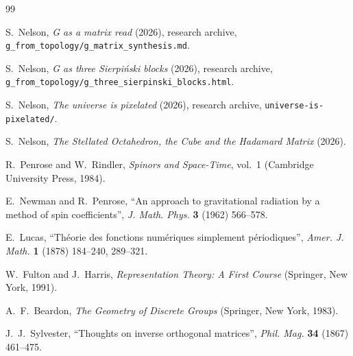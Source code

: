 \documentclass[twocolumn]{iopjournal}
\begin{document}
\begin{thebibliography}{99}

S.~Nelson,
\textit{G as a matrix read} (2026), research archive,
\texttt{g\_from\_topology/g\_matrix\_synthesis.md}.

S.~Nelson,
\textit{G as three Sierpi\'nski blocks} (2026), research archive,
\texttt{g\_from\_topology/}\linebreak\texttt{g\_three\_sierpinski\_blocks.html}.

S.~Nelson,
\textit{The universe is pixelated} (2026), research archive,
\texttt{universe-is-pixelated/}.

S.~Nelson,
\textit{The Stellated Octahedron, the Cube and the Hadamard Matrix}
(2026).

R.~Penrose and W.~Rindler,
\textit{Spinors and Space-Time}, vol.~1
(Cambridge University Press, 1984).

E.~Newman and R.~Penrose,
``An approach to gravitational radiation by a method of spin
coefficients'', \textit{J. Math. Phys.} \textbf{3} (1962) 566--578.

E.~Lucas,
``Th\'eorie des fonctions num\'eriques simplement p\'eriodiques'',
\textit{Amer. J. Math.} \textbf{1} (1878) 184--240, 289--321.

W.~Fulton and J.~Harris,
\textit{Representation Theory: A First Course}
(Springer, New York, 1991).

A.~F.~Beardon,
\textit{The Geometry of Discrete Groups}
(Springer, New York, 1983).

J.~J.~Sylvester,
``Thoughts on inverse orthogonal matrices'',
\textit{Phil. Mag.} \textbf{34} (1867) 461--475.

\end{thebibliography}
\end{document}
